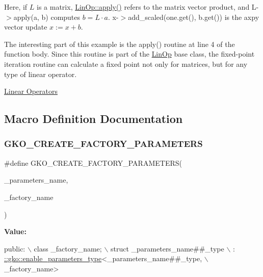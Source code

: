 Here, if $L$ is a matrix, \hyperlink{classgko_1_1LinOp_a0449b2fc705d2f970855af23b5e2788e}{Lin\+Op\+::apply()} refers to the matrix vector product, and {\ttfamily L-\/$>$apply(a, b)} computes $b = L \cdot a$. {\ttfamily x-\/$>$add\+\_\+scaled(one.\+get(), b.\+get())} is the {\ttfamily axpy} vector update $x:=x+b$.

The interesting part of this example is the apply() routine at line 4 of the function body. Since this routine is part of the \hyperlink{classgko_1_1LinOp}{Lin\+Op} base class, the fixed-\/point iteration routine can calculate a fixed point not only for matrices, but for any type of linear operator.

\hyperlink{group__LinOp}{Linear Operators} 

\subsection{Macro Definition Documentation}
\mbox{\label{group__LinOp_ga1fc8e9d8be0c9ad2d72bc1ddfc6d8358}} 
\subsubsection{\texorpdfstring{G\+K\+O\+\_\+\+C\+R\+E\+A\+T\+E\+\_\+\+F\+A\+C\+T\+O\+R\+Y\+\_\+\+P\+A\+R\+A\+M\+E\+T\+E\+RS}{GKO\_CREATE\_FACTORY\_PARAMETERS}}
{\footnotesize\ttfamily \#define G\+K\+O\+\_\+\+C\+R\+E\+A\+T\+E\+\_\+\+F\+A\+C\+T\+O\+R\+Y\+\_\+\+P\+A\+R\+A\+M\+E\+T\+E\+RS(\begin{DoxyParamCaption}\item[{}]{\+\_\+parameters\+\_\+name,  }\item[{}]{\+\_\+factory\+\_\+name }\end{DoxyParamCaption})}

{\bfseries Value\+:}
\begin{DoxyCode}
\textcolor{keyword}{public}:                                                                \(\backslash\)
    class \_factory\_name;                                               \(\backslash\)
    struct \_parameters\_name##\_type                                     \(\backslash\)
        : \hyperlink{structgko_1_1enable__parameters__type}{::gko::enable\_parameters\_type}<\_parameters\_name##\_type,       \(\backslash\)
                                        \_factory\_name>
\end{DoxyCode}



